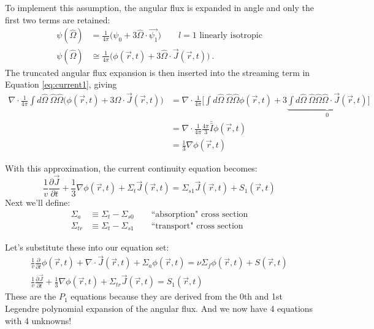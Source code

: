 \documentclass[12pt]{article}
\newcommand{\vOmega}{\ensuremath{\hat{\Omega}}}
\begin{document}
To implement this assumption, the angular flux is expanded in angle and only the first two terms are retained:  
%
\begin{align}
\psi(\vOmega) &=  \frac{1}{4\pi}\bigl( \psi_{0} + 3\vOmega \cdot \vec{\psi_{1}} \bigr) \qquad l=1 \text{ linearly isotropic} \\
%
\psi(\vOmega) &\cong \frac{1}{4\pi}\bigl(\phi(\vec{r}, t) + 3 \vOmega \cdot \vec{J}(\vec{r}, t)\bigr) \:.
  \label{eq:angExpand} 
\end{align}
The truncated angular flux expansion is then inserted into the streaming term in Equation \eqref{eq:current1}, giving 
%
\begin{align}
  \nabla \cdot \frac{1}{4\pi} \int d \vOmega \:\vOmega \vOmega  \bigl(\phi(\vec{r}, t) + 3 \vOmega \cdot \vec{J}(\vec{r}, t)\bigr) &=  
%
\nabla \cdot \frac{1}{4\pi} \bigl[\int d \vOmega \:\vOmega \vOmega  \phi(\vec{r}, t) 
%
+ 3 \underbrace{\int d \vOmega \:\vOmega \vOmega \vOmega \cdot \vec{J}(\vec{r}, t)}_{0} \bigr] \nonumber \\
% 
&= \nabla \cdot \frac{1}{4\pi} \frac{4\pi}{3}\bar{\bar{I}} \phi(\vec{r}, t) \\
%
  &= \frac{1}{3} \nabla \phi(\vec{r}, t) 
  \label{eq:firstTerm}
\end{align}

With this approximation, the current continuity equation becomes:
\begin{equation}
\frac{1}{v}\frac{\partial \vec{J}}{\partial t} 
+ \frac{1}{3} \nabla \phi(\vec{r}, t) +
\Sigma_t  \vec{J}(\vec{r}, t) =
\Sigma_{s1} \vec{J}(\vec{r},t)
+ S_{1}(\vec{r}, t) 
\label{eq:current1}
\end{equation}
%
Next we'll define:
\begin{align}
\Sigma_a &\equiv \Sigma_t - \Sigma_{s0} \qquad \text{``absorption" cross section}\\
\Sigma_{tr} &\equiv \Sigma_t - \Sigma_{s1} \qquad \text{``transport" cross section}
\end{align}

Let's substitute these into our equation set:
%
\begin{align}
\frac{1}{v}\frac{\partial}{\partial t}\phi(\vec{r}, t) + 
\nabla \cdot \vec{J}(\vec{r}, t) + 
\Sigma_a \phi(\vec{r}, t) =
\nu \Sigma_f \phi(\vec{r}, t) +
S(\vec{r}, t) \\
%
\frac{1}{v}\frac{\partial \vec{J}}{\partial t} 
+ \frac{1}{3} \nabla \phi(\vec{r}, t) +
\Sigma_{tr}  \vec{J}(\vec{r}, t) =
S_{1}(\vec{r}, t) 
\end{align}
%
These are the $P_1$ equations because they are derived from the 0th and 1st Legendre polynomial expansion of the angular flux. And we now have 4 equations with 4 unknowns!
\end{document}
